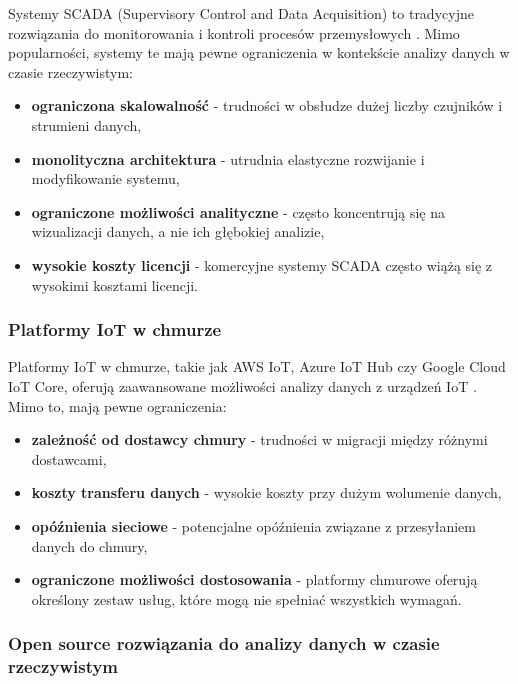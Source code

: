 Systemy SCADA (Supervisory Control and Data Acquisition) to tradycyjne rozwiązania do monitorowania i kontroli procesów przemysłowych \citep{scada}.
Mimo popularności, systemy te mają pewne ograniczenia w kontekście analizy danych w czasie rzeczywistym:

\begin{itemize}
    \item \textbf{ograniczona skalowalność} - trudności w obsłudze dużej liczby czujników i strumieni danych,
    \item \textbf{monolityczna architektura} - utrudnia elastyczne rozwijanie i modyfikowanie systemu,
    \item \textbf{ograniczone możliwości analityczne} - często koncentrują się na wizualizacji danych, a nie ich głębokiej analizie,
    \item \textbf{wysokie koszty licencji} - komercyjne systemy SCADA często wiążą się z wysokimi kosztami licencji.
\end{itemize}

\subsubsection{Platformy IoT w chmurze}
\label{subsubsec:cloud_iot}

Platformy IoT w chmurze, takie jak AWS IoT, Azure IoT Hub czy Google Cloud IoT Core, oferują zaawansowane możliwości analizy danych z
urządzeń IoT \citep{cloud_iot}. Mimo to, mają pewne ograniczenia:

\begin{itemize}
    \item \textbf{zależność od dostawcy chmury} - trudności w migracji między różnymi dostawcami,
    \item \textbf{koszty transferu danych} - wysokie koszty przy dużym wolumenie danych,
    \item \textbf{opóźnienia sieciowe} - potencjalne opóźnienia związane z przesyłaniem danych do chmury,
    \item \textbf{ograniczone możliwości dostosowania} - platformy chmurowe oferują określony zestaw usług, które mogą nie spełniać wszystkich wymagań.
\end{itemize}

\subsubsection{Open source rozwiązania do analizy danych w czasie rzeczywistym}
\label{subsubsec:open_source}

